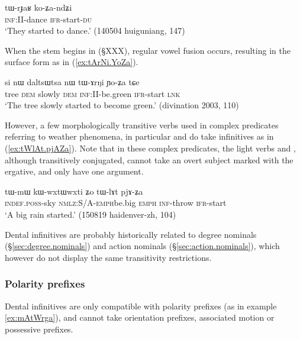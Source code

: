 \begin{exe} 
\ex \label{ex:tWrJaR.koZandZi}
\gll tɯ-rɟaʁ ko-ʑa-ndʑi \\
\textsc{inf:II}-dance \textsc{ifr}-start-\textsc{du} \\
\glt `They started to dance.' (140504 huiguniang, 147)
\end{exe} 

When the stem begins in  (§XXX), regular vowel fusion occurs, resulting in the surface form  as in (\ref{ex:tArNi.YoZa}).

\begin{exe} 
\ex \label{ex:tArNi.YoZa}
\gll si nɯ daltsɯtsa nɯ tɯ-ɤrŋi ɲo-ʑa tɕe \\
tree \textsc{dem} slowly \textsc{dem} \textsc{inf}:II-be.green \textsc{ifr}-start \textsc{lnk} \\
\glt `The tree slowly started to become green.' (divination 2003, 110)
\end{exe} 

However, a few morphologically transitive verbs used in complex predicates referring to weather phenomena, in particular  and  do take  infinitives as in (\ref{ex:tWlAt.pjAZa}).  Note that in these complex predicates, the light verbs  and , although transitively conjugated, cannot take an overt subject marked with the ergative, and only have one argument.
 
\begin{exe}
\ex  \label{ex:tWlAt.pjAZa}
\gll tɯ-mɯ kɯ-wxtɯ\redp{}wxti ʑo tɯ-lɤt pjɤ-ʑa \\
\textsc{indef.poss}-sky \textsc{nmlz:S/A-emph}\redp{}be.big \textsc{emph} \textsc{inf}-throw \textsc{ifr}-start \\
\glt `A big rain started.' (150819 haidenver-zh, 104)
\end{exe}

Dental infinitives are probably historically related to degree nominals (§\ref{sec:degree.nominals}) and action nominals (§\ref{sec:action.nominals}), which however do not display the same transitivity restrictions.

\subsubsection{Polarity prefixes}
Dental infinitives are only compatible with polarity prefixes (as in example \ref{ex:mAtWrga}), and cannot take orientation prefixes, associated motion or possessive prefixes.


